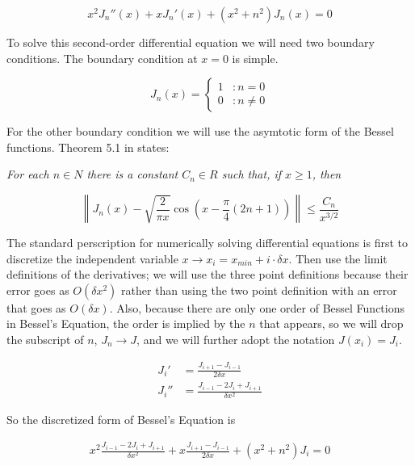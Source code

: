 \documentclass[twocolumn, groupedaddress]{revtex4-1}
\begin{document}
\begin{equation}
\label{eqn:Bessel's Equation}
x^2 J_n''(x) + x J_n'(x) + (x^2 + n^2) J_n(x) = 0
\end{equation}

To solve this second-order differential equation we will need two boundary conditions.  The boundary condition at $x=0$ is simple.

\begin{displaymath}
   J_n(x) = \left\{
     \begin{array}{lr}
       1 & : n = 0     \\
       0 & : n \neq 0
     \end{array}
   \right.
\end{displaymath}

For the other boundary condition we will use the asymtotic form of the Bessel functions.  Theorem 5.1 in \cite{folland} states:

\textit{For each $n \in N$ there is a constant $C_n \in R$ such that, if $x \geq 1$, then}

\begin{equation}
\left\| J_n(x) - \sqrt{\frac{2}{\pi x}} \cos \left( x - \frac{\pi}{4} (2n+1) \right) \right\| \leq \frac{C_n}{x^{3/2}}
\end{equation}

The standard perscription for numerically solving differential equations is first to discretize the independent variable $x \to x_i = x_{min} + i \cdot \delta x$.  Then use the limit definitions of the derivatives; we will use the three point definitions because their error goes as $O(\delta x^2)$ rather than using the two point definition with an error that goes as $O(\delta x)$.  Also, because there are only one order of Bessel Functions in Bessel's Equation, the order is implied by the $n$ that appears, so we will drop the subscript of $n$, $J_n \to J$, and we will further adopt the notation $J(x_i) = J_i$.

\begin{align}
J_i'  &= \frac{J_{i+1} - J_{i-1}}{2 \delta x} \\
J_i'' &= \frac{J_{i-1} - 2J_{i} + J_{i+1}}{\delta x^2}
\end{align}

So the discretized form of Bessel's Equation is

\begin{align}
\label{eqn:Bessel's Equation Discretized}
x^2 \frac{J_{i-1} - 2J_{i} + J_{i+1}}{\delta x^2} + x \frac{J_{i+1} - J_{i-1}}{2 \delta x} + (x^2 + n^2) J_i = 0
\end{align}
\end{document}
